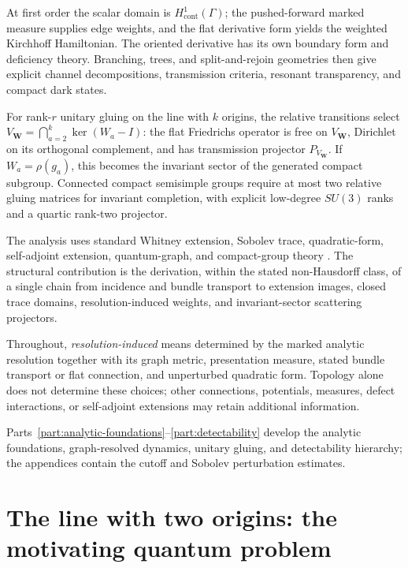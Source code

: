 \documentclass[11pt]{article}
\theoremstyle{plain}
\theoremstyle{definition}
\begin{document}
At first order the scalar domain is \(H^1_{\mathrm{cont}}(\Gamma)\); the pushed-forward marked measure supplies edge weights, and the flat derivative form yields the weighted Kirchhoff Hamiltonian. The oriented derivative has its own boundary form and deficiency theory. Branching, trees, and split-and-rejoin geometries then give explicit channel decompositions, transmission criteria, resonant transparency, and compact dark states.

For rank-\(r\) unitary gluing on the line with \(k\) origins, the relative transitions select \(V_{\mathbf W}=\bigcap_{a=2}^k\ker(W_a-I)\): the flat Friedrichs operator is free on \(V_{\mathbf W}\), Dirichlet on its orthogonal complement, and has transmission projector \(P_{V_{\mathbf W}}\). If \(W_a=\rho(g_a)\), this becomes the invariant sector of the generated compact subgroup. Connected compact semisimple groups require at most two relative gluing matrices for invariant completion, with explicit low-degree \(SU(3)\) ranks and a quartic rank-two projector.

The analysis uses standard Whitney extension, Sobolev trace, quadratic-form, self-adjoint extension, quantum-graph, and compact-group theory \citep{Whitney1934Extension,Fefferman2006Whitney,AdamsFournier2003,Kato1995,KostrykinSchrader99,BerkolaikoKuchment2013,Hall2015,FultonHarris1991}. The structural contribution is the derivation, within the stated non-Hausdorff class, of a single chain from incidence and bundle transport to extension images, closed trace domains, resolution-induced weights, and invariant-sector scattering projectors.

Throughout, \emph{resolution-induced} means determined by the marked analytic resolution together with its graph metric, presentation measure, stated bundle transport or flat connection, and unperturbed quadratic form. Topology alone does not determine these choices; other connections, potentials, measures, defect interactions, or self-adjoint extensions may retain additional information.

Parts~\ref{part:analytic-foundations}--\ref{part:detectability} develop the analytic foundations, graph-resolved dynamics, unitary gluing, and detectability hierarchy; the appendices contain the cutoff and Sobolev perturbation estimates.

\section{The line with two origins: the motivating quantum problem}
\label{sec:L2}
\end{document}

